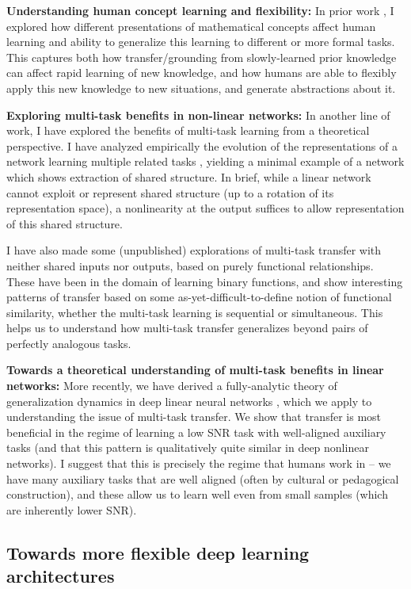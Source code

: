 \documentclass[11pt]{article}
\begin{document}
\textbf{Understanding human concept learning and flexibility:} In prior work \citep{Lampinen2017b}, I explored how different presentations of mathematical concepts affect human learning and ability to generalize this learning to different or more formal tasks. This captures both how transfer/grounding from slowly-learned prior knowledge can affect rapid learning of new knowledge, and how humans are able to flexibly apply this new knowledge to new situations, and generate abstractions about it. \par 
\textbf{Exploring multi-task benefits in non-linear networks:} In another line of work, I have explored the benefits of multi-task learning from a theoretical perspective. I have analyzed empirically the evolution of the representations of a network learning multiple related tasks \citep{Lampinen2017a}, yielding a minimal example of a network which shows extraction of shared structure. In brief, while a linear network cannot exploit or represent shared structure (up to a rotation of its representation space), a nonlinearity at the output suffices to allow representation of this shared structure. \par
I have also made some (unpublished) explorations of multi-task transfer with neither shared inputs nor outputs, based on purely functional relationships. These have been in the domain of learning binary functions, and show interesting patterns of transfer based on some as-yet-difficult-to-define notion of functional similarity, whether the multi-task learning is sequential or simultaneous. This helps us to understand how multi-task transfer generalizes beyond pairs of perfectly analogous tasks. \par
\textbf{Towards a theoretical understanding of multi-task benefits in linear networks:} More recently, we have derived a fully-analytic theory of generalization dynamics in deep linear neural networks \citep{Lampinen2019}, which we apply to understanding the issue of multi-task transfer. We show that transfer is most beneficial in the regime of learning a low SNR task with well-aligned auxiliary tasks (and that this pattern is qualitatively quite similar in deep nonlinear networks). I suggest that this is precisely the regime that humans work in -- we have many auxiliary tasks that are well aligned (often by cultural or pedagogical construction), and these allow us to learn well even from small samples (which are inherently lower SNR). \par 

\subsection{Towards more flexible deep learning architectures} \label{eml_sec}
\end{document}
